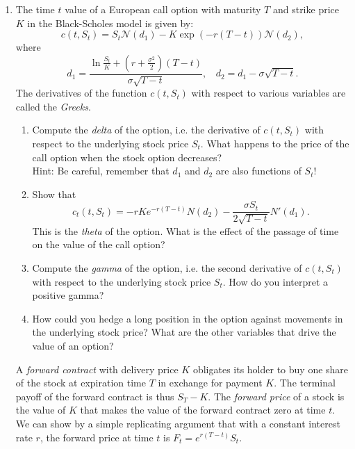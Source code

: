 \documentclass[11pt,a4,table]{article}
\begin{document}
\begin{enumerate}
    
    \item The time $t$ value of a European call option with maturity $T$ and strike price $K$ in the Black-Scholes model is given by:
    \begin{equation}
        c(t,S_t) = S_t \mathcal{N}(d_1) - K \exp(-r(T-t))\mathcal{N}(d_2),
    \end{equation}
    where
    \begin{equation*}
        d_1=\frac{\ln \frac{S_t}{K} + \left(r+\frac{\sigma^2}{2}\right)(T-t)}{\sigma\sqrt{T-t}},~~~~ d_2=d_1 - \sigma \sqrt{T-t}.
    \end{equation*}
    The derivatives of the function $c(t,S_t)$ with respect to various variables are called the \textit{Greeks}.
    \begin{enumerate}
        \item Compute the \textit{delta} of the option, i.e. the derivative of $c(t,S_t)$ with respect to the underlying stock price $S_t$. What happens to the price of the call option when the stock option decreases?\\
        Hint: Be careful, remember that $d_1$ and $d_2$ are also functions of $S_t$!
        
        \item Show that
        \begin{equation}
            c_t(t,S_t) = -rKe^{-r(T-t)}N(d_2) - \frac{\sigma S_t}{2\sqrt{T-t}}N'(d_1).
        \end{equation}
        This is the \textit{theta} of the option. What is the effect of the passage of time on the value of the call option?
        
        \item Compute the \textit{gamma} of the option, i.e. the second derivative of $c(t,S_t)$ with respect to the underlying stock price $S_t$. How do you interpret a positive gamma?
        
        \item How could you hedge a long position in the option against movements in the underlying stock price? What are the other variables that drive the value of an option?
    \end{enumerate}
    
    A \textit{forward contract} with delivery price $K$ obligates its holder to buy one share of the stock at expiration time $T$ in exchange for payment $K$. The terminal payoff of the forward contract is thus $S_T - K$. The \textit{forward price} of a stock is the value of $K$ that makes the value of the forward contract zero at time $t$. We can show by a simple replicating argument that with a constant interest rate $r$, the forward price at time $t$ is $F_t=e^{r(T-t)}S_t$.
    \begin{enumerate}
        \setcounter{enumii}{4}
    

\end{enumerate}
\end{enumerate}
\end{document}
